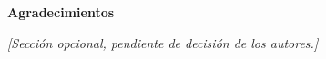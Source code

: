 \clearpage
    \thispagestyle{plain}
    \begin{center}
        \vspace*{2cm}
        \textbf{Agradecimientos}
        
        \vspace{0.8cm}
        \textit{[Sección opcional, pendiente de decisión de los autores.]}
        
        \vspace{15cm}
    \end{center}
\clearpage
